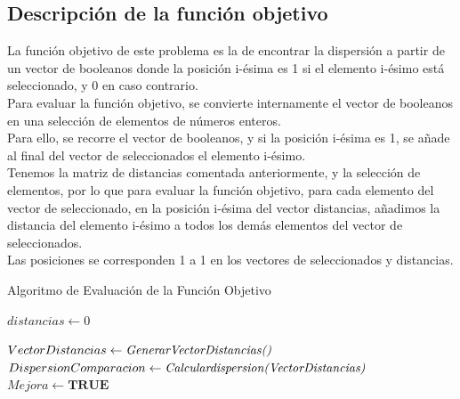 \documentclass{article}
\begin{document}
\vspace{5mm}



\subsection{\large Descripción de la función objetivo}
La función objetivo de este problema es la de encontrar la dispersión a partir de un vector de
booleanos donde la posición i-ésima es 1 si el elemento i-ésimo está seleccionado, y 0 en caso contrario.\\
Para evaluar la función objetivo, se convierte internamente el vector de booleanos en una selección
de elementos de números enteros.\\
Para ello, se recorre el vector de booleanos, y si la posición i-ésima es 1, se añade al final del vector de
seleccionados el elemento i-ésimo.\\
Tenemos la matriz de distancias comentada anteriormente, y la selección de elementos, por lo
que para evaluar la función objetivo, para cada elemento del vector de seleccionado, en la posición i-ésima
del vector distancias, añadimos la distancia del elemento i-ésimo a todos los demás elementos del vector de seleccionados.\\
Las posiciones se corresponden 1 a 1 en los vectores de seleccionados y distancias.
\vspace{5mm}

\begin{algorithm}
	\scriptsize
	\label{Algoritmo de Evaluacion de la Funcion Objetivo}
	\caption{Algoritmo de Evaluación de la Función Objetivo}
	$distancias \leftarrow 0$\\

	\vspace{3mm}

	\vspace{3mm}
	$Vector Distancias \leftarrow{\emph{GenerarVectorDistancias()}}$\\
	$Dispersion Comparacion \leftarrow{\emph{Calculardispersion(VectorDistancias)}}$\\
	\vspace{3mm}
	$Mejora \leftarrow {\textbf{TRUE}}$\\

\end{algorithm}
\end{document}
